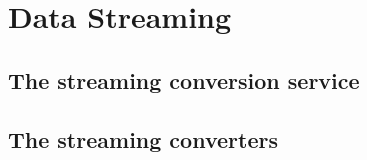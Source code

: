 %
%
%
%
%

\chapter{Data Streaming}

\section{The streaming conversion service}

\section{The streaming converters}
